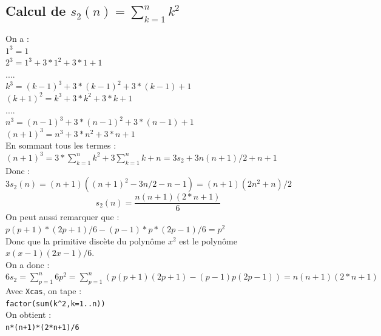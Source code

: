 \documentclass[a4paper,11pt]{book}
\begin{document}
\subsection{Calcul de $s_2(n)=\sum_{k=1}^nk^2$}
On a :\\
$1^3=1$\\
$2^3=1^3+3*1^2+3*1+1$\\
$....$\\
$k^3=(k-1)^3+3*(k-1)^2+3*(k-1)+1$\\
$(k+1)^2=k^3+3*k^2+3*k+1$\\
$....$\\
$n^3=(n-1)^3+3*(n-1)^2+3*(n-1)+1$\\
$(n+1)^3=n^3+3*n^2+3*n+1$\\
En sommant tous les termes :\\
$(n+1)^3=3*\sum_{k=1}^nk^2+3\sum_{k=1}^nk+n=3s_2+3n(n+1)/2+n+1$\\
Donc :\\
$3s_2(n)=(n+1)((n+1)^2-3n/2-n-1)=(n+1)(2n^2+n)/2$
$$s_2(n)=\frac{n(n+1)(2*n+1)}{6}$$
On peut aussi remarquer que :\\
$p(p+1)*(2p+1)/6-(p-1)*p*(2p-1)/6=p^2$\\
Donc que la primitive disc\`ete du polyn\^ome
$x^2$ est le polyn\^ome $x(x-1)(2x-1)/6$.\\
On a donc :\\
$6s_2=\sum_{p=1}^n6p^2=\sum_{p=1}^n(p(p+1)(2p+1)-(p-1)p(2p-1))=n(n+1)(2*n+1)$\\
Avec {\tt Xcas}, on tape :\\
{\tt factor(sum(k\verb|^|2,k=1..n))}\\
On obtient :\\
{\tt n*(n+1)*(2*n+1)/6}
\end{document}
